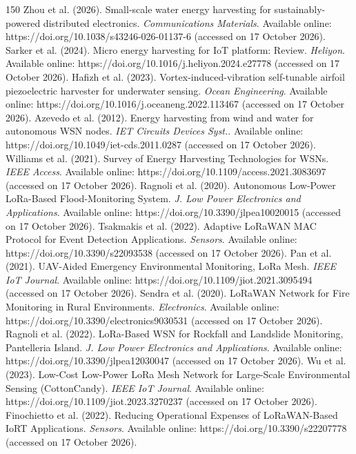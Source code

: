\begin{thebibliography}{150}
Zhou et al. (2026). Small-scale water energy harvesting for sustainably-powered distributed electronics. \textit{Communications Materials}. Available online: https://doi.org/10.1038/s43246-026-01137-6 (accessed on 17 October 2026).
Sarker et al. (2024). Micro energy harvesting for IoT platform: Review. \textit{Heliyon}. Available online: https://doi.org/10.1016/j.heliyon.2024.e27778 (accessed on 17 October 2026).
Hafizh et al. (2023). Vortex-induced-vibration self-tunable airfoil piezoelectric harvester for underwater sensing. \textit{Ocean Engineering}. Available online: https://doi.org/10.1016/j.oceaneng.2022.113467 (accessed on 17 October 2026).
Azevedo et al. (2012). Energy harvesting from wind and water for autonomous WSN nodes. \textit{IET Circuits Devices Syst.}. Available online: https://doi.org/10.1049/iet-cds.2011.0287 (accessed on 17 October 2026).
Williams et al. (2021). Survey of Energy Harvesting Technologies for WSNs. \textit{IEEE Access}. Available online: https://doi.org/10.1109/access.2021.3083697 (accessed on 17 October 2026).
Ragnoli et al. (2020). Autonomous Low-Power LoRa-Based Flood-Monitoring System. \textit{J. Low Power Electronics and Applications}. Available online: https://doi.org/10.3390/jlpea10020015 (accessed on 17 October 2026).
Tsakmakis et al. (2022). Adaptive LoRaWAN MAC Protocol for Event Detection Applications. \textit{Sensors}. Available online: https://doi.org/10.3390/s22093538 (accessed on 17 October 2026).
Pan et al. (2021). UAV-Aided Emergency Environmental Monitoring, LoRa Mesh. \textit{IEEE IoT Journal}. Available online: https://doi.org/10.1109/jiot.2021.3095494 (accessed on 17 October 2026).
Sendra et al. (2020). LoRaWAN Network for Fire Monitoring in Rural Environments. \textit{Electronics}. Available online: https://doi.org/10.3390/electronics9030531 (accessed on 17 October 2026).
Ragnoli et al. (2022). LoRa-Based WSN for Rockfall and Landslide Monitoring, Pantelleria Island. \textit{J. Low Power Electronics and Applications}. Available online: https://doi.org/10.3390/jlpea12030047 (accessed on 17 October 2026).
Wu et al. (2023). Low-Cost Low-Power LoRa Mesh Network for Large-Scale Environmental Sensing (CottonCandy). \textit{IEEE IoT Journal}. Available online: https://doi.org/10.1109/jiot.2023.3270237 (accessed on 17 October 2026).
Finochietto et al. (2022). Reducing Operational Expenses of LoRaWAN-Based IoRT Applications. \textit{Sensors}. Available online: https://doi.org/10.3390/s22207778 (accessed on 17 October 2026).

\end{thebibliography}
